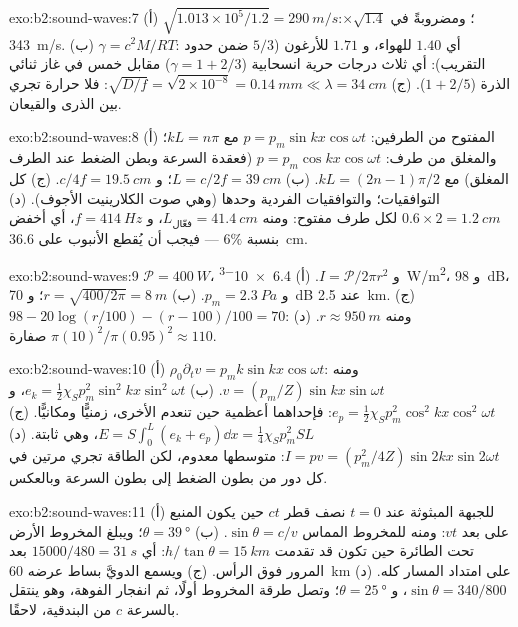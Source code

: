 \begin{solution}{exo:b2:sound-waves:7}
(أ) $\sqrt{1.013 \times 10^5/1.2} = \qty{290}{m/s}$؛ ومضروبةً في $\times\sqrt{1.4}$: \qty{343}{m/s}. (ب)
$\gamma = c^2M/RT$: أي $1.40$ للهواء، و $1.71$ للأرغون ($5/3$ ضمن حدود التقريب):
أي ثلاث درجات حرية انسحابية ($\gamma = 1 + 2/3$) مقابل خمس في
غاز ثنائي الذرة ($1 + 2/5$). (ج) $\sqrt{D/f} = \sqrt{2 \times 10^{-8}} = \qty{0.14}{mm}
\ll \lambda = \qty{34}{cm}$: فلا حرارة تجري بين الذرى والقيعان.
\end{solution}

\begin{solution}{exo:b2:sound-waves:8}
(أ) المفتوح من الطرفين: $p = p_m\sin kx\cos\omega t$ مع $kL = n\pi$؛ والمغلق من طرف:
$p = p_m\cos kx\cos\omega t$ (فعقدة السرعة وبطن الضغط عند الطرف
المغلق) مع $kL = (2n - 1)\pi/2$. (ب) $L = c/2f = \qty{39}{cm}$؛ و $c/4f = \qty{19.5}{cm}$.
(ج) كل التوافقيات؛ والتوافقيات الفردية وحدها (وهي صوت الكلارينيت الأجوف).
(د) $0.6 \times 2 = \qty{1.2}{cm}$ لكل طرف مفتوح: ومنه $L_{\text{فعّال}} = \qty{41.4}{cm}$، و $f =
\qty{414}{Hz}$، أي أخفض بنسبة $6\%$ --- فيجب أن يُقطع الأنبوب على \qty{36.6}{cm}.
\end{solution}

\begin{solution}{exo:b2:sound-waves:9}
$\mathcal P = \qty{400}{W}$، و $I = \mathcal P/2\pi r^2$. (أ) \qty{6.4e-3}{W/m^2}، و \qty{98}{dB}،
و $p_m = \qty{2.3}{Pa}$. (ب) $r = \sqrt{400/2\pi} = \qty{8}{m}$؛ و \qty{70}{dB} عند \qty{2.5}{km}.
(ج) $98 - 20\log(r/100) - (r - 100)/100 = 70$: ومنه $r \approx \qty{950}{m}$. (د)
$\pi(10)^2/\pi(0.95)^2 \approx 110$ صفارة.
\end{solution}

\begin{solution}{exo:b2:sound-waves:10}
(أ) $\rho_0\partial_tv = p_mk\sin kx\cos\omega t$: ومنه $v = (p_m/Z)\sin kx\sin\omega t$. (ب)
$e_k = \tfrac12\chi_Sp_m^2\sin^2kx\sin^2\omega t$، و $e_p = \tfrac12\chi_Sp_m^2\cos^2kx\cos^2\omega t$:
فإحداهما أعظمية حين تنعدم الأخرى، زمنيًّا ومكانيًّا. (ج) $E =
S\int_0^L(e_k + e_p)\dd x = \tfrac14\chi_Sp_m^2SL$، وهي ثابتة. (د) $I = pv =
(p_m^2/4Z)\sin2kx\sin2\omega t$: متوسطها معدوم، لكن الطاقة تجري مرتين في
كل دور من بطون الضغط إلى بطون السرعة وبالعكس.
\end{solution}

\begin{solution}{exo:b2:sound-waves:11}
(أ) للجبهة المبثوثة عند $t = 0$ نصف قطر $ct$ حين يكون المنبع على بعد $vt$:
ومنه للمخروط المماس $\sin\theta = c/v$. (ب) $\theta = \qty{39}{\degree}$؛ ويبلغ المخروط
الأرض تحت الطائرة حين تكون قد تقدمت $h/\tan\theta = \qty{15}{km}$:
أي $15000/480 = \qty{31}{s}$ بعد المرور فوق الرأس. (ج) ويسمع الدويَّ
بساط عرضه \qty{60}{km} على امتداد المسار كله. (د) $\sin\theta
= 340/800$، و $\theta = \qty{25}{\degree}$؛ وتصل طرقة المخروط أولًا، ثم
انفجار الفوهة، وهو ينتقل بالسرعة $c$ من البندقية، لاحقًا.
\end{solution}

